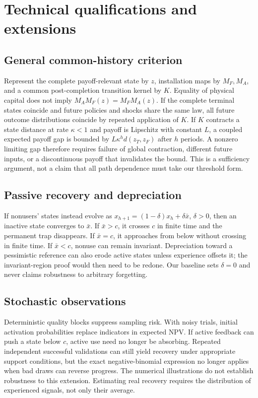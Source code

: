 \documentclass[11pt]{article}
\begin{document}
\section{Technical qualifications and extensions}
\subsection{General common-history criterion}
Represent the complete payoff-relevant state by $z$, installation maps by $M_F,M_A$, and a common post-completion transition kernel by $K$. Equality of physical capital does not imply $M_AM_F(z)=M_FM_A(z)$. If the complete terminal states coincide and future policies and shocks share the same law, all future outcome distributions coincide by repeated application of $K$. If $K$ contracts a state distance at rate $\kappa<1$ and payoff is Lipschitz with constant $L$, a coupled expected payoff gap is bounded by $L\kappa^h d(z_T,z_F)$ after $h$ periods. A nonzero limiting gap therefore requires failure of global contraction, different future inputs, or a discontinuous payoff that invalidates the bound. This is a sufficiency argument, not a claim that all path dependence must take our threshold form.

\subsection{Passive recovery and depreciation}
If nonusers' states instead evolve as $x_{h+1}=(1-\delta)x_h+\delta\bar x$, $\delta>0$, then an inactive state converges to $\bar x$. If $\bar x>c$, it crosses $c$ in finite time and the permanent trap disappears. If $\bar x=c$, it approaches from below without crossing in finite time. If $\bar x<c$, nonuse can remain invariant. Depreciation toward a pessimistic reference can also erode active states unless experience offsets it; the invariant-region proof would then need to be redone. Our baseline sets $\delta=0$ and never claims robustness to arbitrary forgetting.

\subsection{Stochastic observations}
Deterministic quality blocks suppress sampling risk. With noisy trials, initial activation probabilities replace indicators in expected NPV. If active feedback can push a state below $c$, active use need no longer be absorbing. Repeated independent successful validations can still yield recovery under appropriate support conditions, but the exact negative-binomial expression no longer applies when bad draws can reverse progress. The numerical illustrations do not establish robustness to this extension. Estimating real recovery requires the distribution of experienced signals, not only their average.
\end{document}
